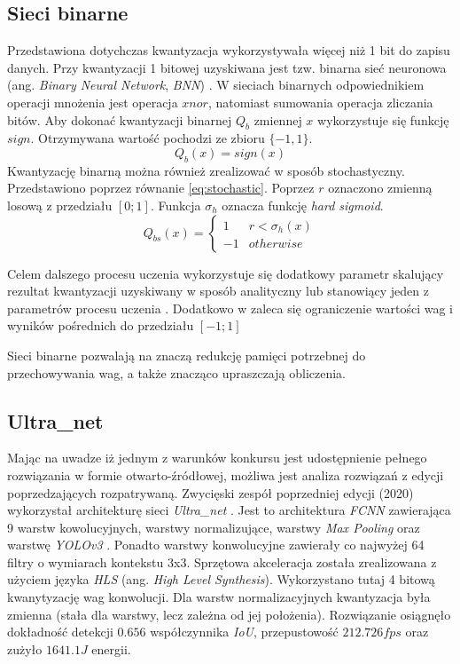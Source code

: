 \subsection{Sieci binarne}

Przedstawiona dotychczas kwantyzacja wykorzystywała więcej niż 1 bit do zapisu danych.
Przy kwantyzacji 1 bitowej uzyskiwana jest tzw. binarna sieć neuronowa (ang. \emph{Binary Neural Network}, \emph{BNN}) \cite{qnn}.
W sieciach binarnych odpowiednikiem operacji mnożenia jest operacja $xnor$, natomiast sumowania operacja zliczania bitów. 
Aby dokonać kwantyzacji binarnej $Q_b$ zmiennej $x$ wykorzystuje się funkcję $sign$. 
Otrzymywana wartość pochodzi ze zbioru $\{-1,1\}$.
\begin{equation}
Q_b(x) = sign(x)
\label{eq:binarize}
\end{equation}
Kwantyzację binarną można również zrealizować w sposób stochastyczny\cite{qnn}.
Przedstawiono poprzez równanie \eqref{eq:stochastic}. 
Poprzez $r$ oznaczono zmienną losową z przedziału $[0;1]$. 
Funkcja $\sigma_h$ oznacza funkcję \emph{hard sigmoid}.
\begin{equation}
Q_{bs}(x) =
\begin{cases}
1 & r < \sigma_h(x) \\
-1 & otherwise
\end{cases}
\label{eq:stochastic}
\end{equation}

Celem dalszego procesu uczenia wykorzystuje się dodatkowy parametr skalujący rezultat kwantyzacji uzyskiwany w sposób analityczny \cite{xnor_net} lub stanowiący jeden z parametrów procesu uczenia \cite{xnor_net++}.
Dodatkowo w \cite{qnn} zaleca się ograniczenie wartości wag i wyników pośrednich do przedziału $[-1;1]$

Sieci binarne pozwalają na znaczą redukcję pamięci potrzebnej do przechowywania wag, a także znacząco upraszczają obliczenia.

\subsection{Ultra\_net}

Mając na uwadze iż jednym z warunków konkursu jest udostępnienie pełnego rozwiązania w formie otwarto-źródłowej, możliwa jest analiza rozwiązań z edycji poprzedzających rozpatrywaną.
Zwycięski zespół poprzedniej edycji (2020) wykorzystał architekturę sieci \emph{Ultra\_net} \cite{ultra_net}. 
Jest to architektura \emph{FCNN} zawierająca 9 warstw kowolucyjnych, warstwy normalizujące, warstwy \textit{Max Pooling} oraz warstwę \emph{YOLOv3} \cite{yolov3}.
Ponadto warstwy konwolucyjne zawierały co najwyżej 64 filtry o wymiarach kontekstu 3x3.
Sprzętowa akceleracja została zrealizowana z użyciem języka \emph{HLS} (ang. \emph{High Level Synthesis}). 
Wykorzystano tutaj 4 bitową kwanytyzację wag konwolucji. 
Dla warstw normalizacyjnych kwantyzacja była zmienna (stała dla warstwy, lecz zależna od jej  położenia).
Rozwiązanie osiągnęło dokładność detekcji $0.656$ współczynnika \emph{IoU}, przepustowość $212.726 fps$ oraz zużyło $1641.1 J$ energii. 

